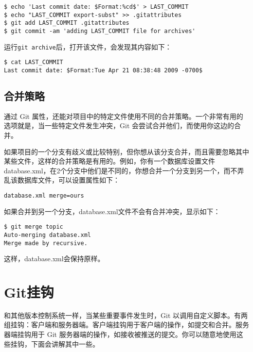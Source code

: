 \documentclass[a4paper]{book}
\newcounter{tab}[chapter]
\begin{document}
\begin{shaded}\begin{verbatim}
$ echo 'Last commit date: $Format:%cd$' > LAST_COMMIT
$ echo "LAST_COMMIT export-subst" >> .gitattributes
$ git add LAST_COMMIT .gitattributes
$ git commit -am 'adding LAST_COMMIT file for archives'
\end{verbatim}\end{shaded}

运行\texttt{git archive}后，打开该文件，会发现其内容如下：

\begin{shaded}\begin{verbatim}
$ cat LAST_COMMIT
Last commit date: $Format:Tue Apr 21 08:38:48 2009 -0700$
\end{verbatim}\end{shaded}

\subsection{合并策略}

通过 Git 属性，还能对项目中的特定文件使用不同的合并策略。一个非常有用的选项就是，当一些特定文件发生冲突，Git 会尝试合并他们，而使用你这边的合并。

如果项目的一个分支有歧义或比较特别，但你想从该分支合并，而且需要忽略其中某些文件，这样的合并策略是有用的。例如，你有一个数据库设置文件database.xml，在2个分支中他们是不同的，你想合并一个分支到另一个，而不弄乱该数据库文件，可以设置属性如下：

\begin{shaded}\begin{verbatim}
database.xml merge=ours
\end{verbatim}\end{shaded}

如果合并到另一个分支，database.xml文件不会有合并冲突，显示如下：

\begin{shaded}\begin{verbatim}
$ git merge topic
Auto-merging database.xml
Merge made by recursive.
\end{verbatim}\end{shaded}

这样，database.xml会保持原样。

\section{Git挂钩}

和其他版本控制系统一样，当某些重要事件发生时，Git 以调用自定义脚本。有两组挂钩：客户端和服务器端。客户端挂钩用于客户端的操作，如提交和合并。服务器端挂钩用于 Git 服务器端的操作，如接收被推送的提交。你可以随意地使用这些挂钩，下面会讲解其中一些。
\end{document}
